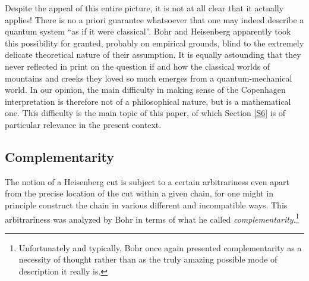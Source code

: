\documentclass[12pt]{article}
\begin{document}
Despite the appeal of this entire picture, it is not at all clear that it actually applies! There is no a priori guarantee whatsoever that one may indeed describe a quantum system ``as if it were classical''.  Bohr and Heisenberg apparently took this possibility for granted, probably on empirical grounds, blind to  the extremely delicate theoretical nature of their assumption. It is equally astounding that they never reflected in print on the question if and how  the classical worlds of mountains and creeks they loved so much emerges from  a quantum-mechanical world. In our opinion, the main difficulty in making sense of the Copenhagen interpretation is therefore not of a philosophical nature, 
but is a mathematical one. This difficulty is the main topic of this paper, of which Section \ref{S6} is of particular relevance in the present context.
\subsection{Complementarity}\label{compl}
The notion of a Heisenberg cut is subject to a certain arbitrariness even apart from the precise location of the cut within a given chain, for one might in principle construct the chain in various different and incompatible ways. This arbitrariness was analyzed by Bohr in terms of what he called \textit{complementarity}.\footnote{Unfortunately and typically, Bohr 
once again presented complementarity as a necessity of thought rather than as the truly amazing  possible mode of description it really is.} 
\end{document}
